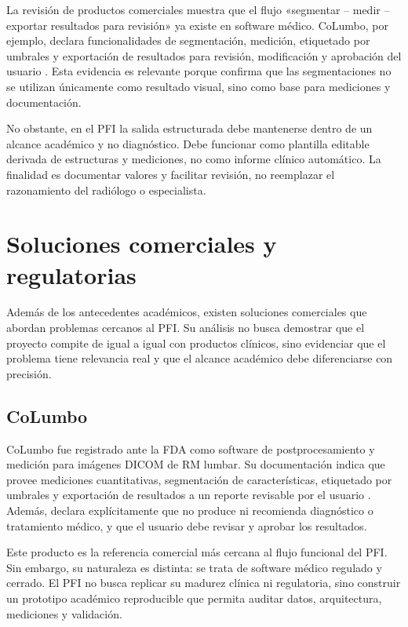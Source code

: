 La revisión de productos comerciales muestra que el flujo «segmentar – medir – exportar resultados para revisión» ya existe en software médico. CoLumbo, por ejemplo, declara funcionalidades de segmentación, medición, etiquetado por umbrales y exportación de resultados para revisión, modificación y aprobación del usuario \parencite{fda_columbo_2022}. Esta evidencia es relevante porque confirma que las segmentaciones no se utilizan únicamente como resultado visual, sino como base para mediciones y documentación.

No obstante, en el PFI la salida estructurada debe mantenerse dentro de un alcance académico y no diagnóstico. Debe funcionar como plantilla editable derivada de estructuras y mediciones, no como informe clínico automático. La finalidad es documentar valores y facilitar revisión, no reemplazar el razonamiento del radiólogo o especialista.

\section{Soluciones comerciales y regulatorias}

Además de los antecedentes académicos, existen soluciones comerciales que abordan problemas cercanos al PFI. Su análisis no busca demostrar que el proyecto compite de igual a igual con productos clínicos, sino evidenciar que el problema tiene relevancia real y que el alcance académico debe diferenciarse con precisión.

\subsection{CoLumbo}

CoLumbo fue registrado ante la FDA como software de postprocesamiento y medición para imágenes DICOM de RM lumbar. Su documentación indica que provee mediciones cuantitativas, segmentación de características, etiquetado por umbrales y exportación de resultados a un reporte revisable por el usuario \parencite{fda_columbo_2022}. Además, declara explícitamente que no produce ni recomienda diagnóstico o tratamiento médico, y que el usuario debe revisar y aprobar los resultados.

Este producto es la referencia comercial más cercana al flujo funcional del PFI. Sin embargo, su naturaleza es distinta: se trata de software médico regulado y cerrado. El PFI no busca replicar su madurez clínica ni regulatoria, sino construir un prototipo académico reproducible que permita auditar datos, arquitectura, mediciones y validación.

